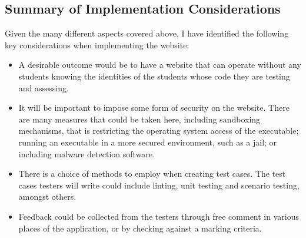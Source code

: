 \documentclass[a4paper,11pt]{report}
\begin{document}
\subsection{Summary of Implementation Considerations}
Given the many different aspects covered above, I have identified the following key considerations when implementing the website:
\begin{itemize}
 \item A desirable outcome would be to have a website that can operate without any students knowing the identities of the students whose code they are testing and assessing.
 \item It will be important to impose some form of security on the website. There are many measures that could be taken here, including sandboxing mechanisms, that is restricting the operating system access of the executable; running an executable in a more secured environment, such as a jail; or including malware detection software.
 \item There is a choice of methods to employ when creating test cases. The test cases testers will write could include linting, unit testing and scenario testing, amongst others.
 \item Feedback could be collected from the testers through free comment in various places of the application, or by checking against a marking criteria.
\end{itemize}


\end{document}
